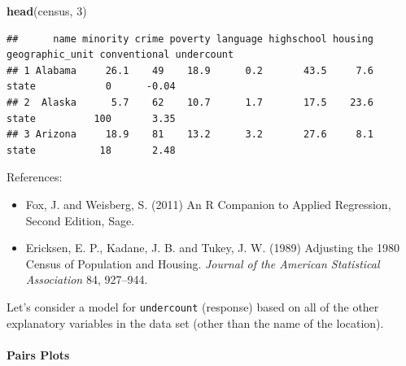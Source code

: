 \documentclass[landscape]{article}
\newenvironment{Shaded}{\begin{snugshade}}{\end{snugshade}}
\newcommand{\KeywordTok}[1]{\textcolor[rgb]{0.13,0.29,0.53}{\textbf{#1}}}
\newcommand{\DecValTok}[1]{\textcolor[rgb]{0.00,0.00,0.81}{#1}}
\newcommand{\StringTok}[1]{\textcolor[rgb]{0.31,0.60,0.02}{#1}}
\newcommand{\OperatorTok}[1]{\textcolor[rgb]{0.81,0.36,0.00}{\textbf{#1}}}
\newcommand{\NormalTok}[1]{#1}
\providecommand{\tightlist}{%
  \setlength{\itemsep}{0pt}\setlength{\parskip}{0pt}}
\let\oldparagraph\paragraph
\renewcommand{\paragraph}[1]{\oldparagraph{#1}\mbox{}}
\begin{document}
\begin{Shaded}
\begin{Highlighting}[]
\KeywordTok{head}\NormalTok{(census, }\DecValTok{3}\NormalTok{)}
\end{Highlighting}
\end{Shaded}

\begin{verbatim}
##      name minority crime poverty language highschool housing geographic_unit conventional undercount
## 1 Alabama     26.1    49    18.9      0.2       43.5     7.6           state            0      -0.04
## 2  Alaska      5.7    62    10.7      1.7       17.5    23.6           state          100       3.35
## 3 Arizona     18.9    81    13.2      3.2       27.6     8.1           state           18       2.48
\end{verbatim}

References:

\begin{itemize}
\tightlist
\item
  Fox, J. and Weisberg, S. (2011) An R Companion to Applied Regression,
  Second Edition, Sage.
\item
  Ericksen, E. P., Kadane, J. B. and Tukey, J. W. (1989) Adjusting the
  1980 Census of Population and Housing. \emph{Journal of the American
  Statistical Association} 84, 927--944.
\end{itemize}

Let's consider a model for \texttt{undercount} (response) based on all
of the other explanatory variables in the data set (other than the name
of the location).

\paragraph{Pairs Plots}\label{pairs-plots}

\begin{Shaded}
\end{Shaded}
\end{document}
